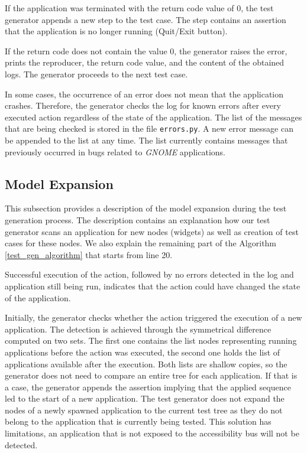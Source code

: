 If the application was terminated with the return code value of 0, the test generator appends a new step to the test case. The step contains an assertion that the application is no longer running (Quit/Exit button). 

If the return code does not contain the value 0, the generator raises the error, prints the reproducer, the return code value, and the content of the obtained logs. The generator proceeds to the next test case. 

In some cases, the occurrence of an error does not mean that the application crashes. Therefore, the generator checks the log for known errors after every executed action regardless of the state of the application. The list of the messages that are being checked is stored in the file \texttt{errors.py}. A new error message can be appended to the list at any time. The list currently contains messages that previously occurred in bugs related to \textit{GNOME} applications.

\subsection{Model Expansion}\label{expansion}
This subsection provides a description of the model expansion during the test generation process. The description contains an explanation how our test generator scans an application for new nodes (widgets) as well as creation of test cases for these nodes. We also explain the remaining part of the Algorithm \ref{test_gen_algorithm} that starts from line 20.

Successful execution of the action, followed by no errors detected in the log and application still being run, indicates that the action could have changed the state of the application. 

Initially, the generator checks whether the action triggered the execution of a new application. The detection is achieved through the symmetrical difference computed on two sets. The first one contains the list nodes representing running applications before the action was executed, the second one holds the list of applications available after the execution. Both lists are shallow copies, so the generator does not need to compare an entire tree for each application. If that is a case, the generator appends the assertion implying that the applied sequence led to the start of a new application. The test generator does not expand the nodes of a newly spawned application to the current test tree as they do not belong to the application that is currently being tested. This solution has limitations, an application that is not exposed to the accessibility bus will not be detected.

